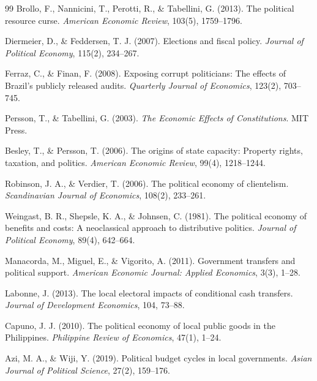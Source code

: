 \documentclass[twocolumn]{article}
\begin{document}
\begin{thebibliography}{99}
Brollo, F., Nannicini, T., Perotti, R., \& Tabellini, G. (2013). The political resource curse. \emph{American Economic Review}, 103(5), 1759--1796.

Diermeier, D., \& Feddersen, T. J. (2007). Elections and fiscal policy. \emph{Journal of Political Economy}, 115(2), 234--267.

Ferraz, C., \& Finan, F. (2008). Exposing corrupt politicians: The effects of Brazil's publicly released audits. \emph{Quarterly Journal of Economics}, 123(2), 703--745.

Persson, T., \& Tabellini, G. (2003). \emph{The Economic Effects of Constitutions}. MIT Press.

Besley, T., \& Persson, T. (2006). The origins of state capacity: Property rights, taxation, and politics. \emph{American Economic Review}, 99(4), 1218--1244.

Robinson, J. A., \& Verdier, T. (2006). The political economy of clientelism. \emph{Scandinavian Journal of Economics}, 108(2), 233--261.

Weingast, B. R., Shepsle, K. A., \& Johnsen, C. (1981). The political economy of benefits and costs: A neoclassical approach to distributive politics. \emph{Journal of Political Economy}, 89(4), 642--664.

Manacorda, M., Miguel, E., \& Vigorito, A. (2011). Government transfers and political support. \emph{American Economic Journal: Applied Economics}, 3(3), 1--28.

Labonne, J. (2013). The local electoral impacts of conditional cash transfers. \emph{Journal of Development Economics}, 104, 73--88.

Capuno, J. J. (2010). The political economy of local public goods in the Philippines. \emph{Philippine Review of Economics}, 47(1), 1--24.

Azi, M. A., \& Wiji, Y. (2019). Political budget cycles in local governments. \emph{Asian Journal of Political Science}, 27(2), 159--176.

\end{thebibliography}
\end{document}
